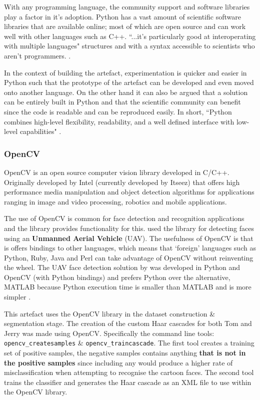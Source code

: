 \documentclass[report, 11pt, oneside]{dissertation}
\begin{document}
With any programming language, the community support and software libraries play a factor in it's adoption. Python has a vast amount of scientific software libraries that are available online; most of which are open source and can work well with other languages such as C++. ``...it’s particularly good at interoperating with multiple languages" structures and with a syntax accessible to scientists who aren’t programmers. \citep[14]{Perez:2011tp}. 

In the context of building the artefact, experimentation is quicker and easier in Python such that the prototype of the artefact can be developed and even moved onto another language. On the other hand it can also be argued that a solution can be entirely built in Python and that the scientific community can benefit since the code is readable and can be reproduced easily. In short, ``Python combines high-level flexibility, readability, and a well defined interface with low-level capabilities" \citep[15]{Perez:2011tp}.

\subsubsection{OpenCV}

OpenCV is an open source computer vision library developed in C/C++. Originally developed by Intel (currently developed by Itseez) that offers high performance media manipulation and object detection algorithms for applications ranging in image and video processing, robotics and mobile applications.

The use of OpenCV is common for face detection and recognition applications and the library provides functionality for this. \citep{Jalled:2016vi} used the library for detecting faces using an \textbf{Unmanned Aerial Vehicle} (UAV). The usefulness of OpenCV is that is offers bindings to other languages, which means that `foreign' languages such as Python, Ruby, Java and Perl can take advantage of OpenCV without reinventing the wheel. The UAV face detection solution by \citeauthor{Jalled:2016vi} was developed in Python and OpenCV (with Python bindings) and prefers Python over the alternative, MATLAB because Python execution time is smaller than MATLAB and is more simpler \citeyearpar{Jalled:2016vi}.

This artefact uses the OpenCV library in the dataset construction \& segmentation stage. The creation of the custom Haar cascades for both Tom and Jerry was made using OpenCV. Specifically the command line tools: \texttt{opencv\_createsamples} \& \texttt{opencv\_traincascade}. The first tool creates a training set of positive samples, the negative samples contains  anything \textbf{that is not in the positive samples} since including any would produce a higher rate of misclassification when attempting to recognise the cartoon faces. The second tool trains the classifier and generates the Haar cascade as an XML file to use within the OpenCV library.
\end{document}
